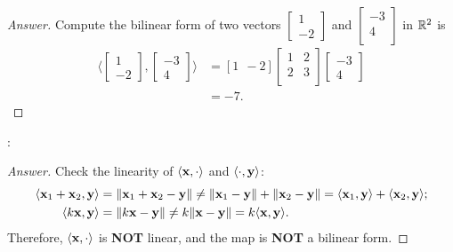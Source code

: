 \begin{proof}[Answer]
\noindent Compute the bilinear form of two vectors
%
$\begin{bmatrix}
        1 \\
        -2
    \end{bmatrix}$ 
%
and 
%
$\begin{bmatrix}
        -3\\
        4\\
    \end{bmatrix}$
%
in $\mathbb{R}^2$ is 
%
\begin{align*}
    \langle 
    \begin{bmatrix}
        1 \\
        -2
    \end{bmatrix},
    \begin{bmatrix}
        -3\\
        4
    \end{bmatrix} 
    \rangle 
    &= [1 ~\ -2]
    \begin{bmatrix}
        1   &2  \\
        2   &3  \\
    \end{bmatrix}
    \begin{bmatrix}
    -3\\ 
    4
    \end{bmatrix}\\
&= -7.
\end{align*}   
\end{proof}
\vspace{1cm}

\noindent {}:
\begin{proof}[Answer]
\label{answer:bf3}
    Check the linearity of $\langle \mathbf{x}, \cdot \rangle$ and $\langle \cdot,\mathbf{y} \rangle$:
%
\begin{align*}
    \langle \mathbf{x}_1 + \mathbf{x}_2, \mathbf{y} \rangle &= \Vert \mathbf{x}_1 + \mathbf{x}_2 - \mathbf{y} \Vert \neq \Vert \mathbf{x}_1 - \mathbf{y} \Vert + \Vert \mathbf{x}_2 - \mathbf{y} \Vert = \langle \mathbf{x}_1, \mathbf{y} \rangle + \langle \mathbf{x}_2, \mathbf{y} \rangle; \\
    \langle k\mathbf{x}, \mathbf{y} \rangle &= \Vert k\mathbf{x} - \mathbf{y} \Vert \neq k \Vert \mathbf{x} - \mathbf{y} \Vert = k \langle \mathbf{x}, \mathbf{y} \rangle.
\end{align*}
%
Therefore, $\langle \mathbf{x}, \cdot \rangle$ is \textbf{NOT} linear, and the map is \textbf{NOT} a bilinear form.
\end{proof}
\vspace{1cm}

